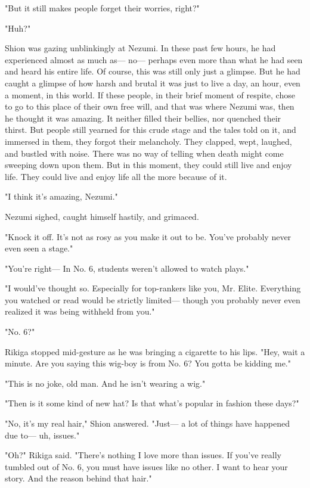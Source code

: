 "But it still makes people forget their worries, right?"

"Huh?"

Shion was gazing unblinkingly at Nezumi. In these past few hours, he had
experienced almost as much as--- no--- perhaps even more than what he had
seen and heard his entire life. Of course, this was still only just a
glimpse. But he had caught a glimpse of how harsh and brutal it was just
to live a day, an hour, even a moment, in this world. If these people,
in their brief moment of respite, chose to go to this place of their own
free will, and that was where Nezumi was, then he thought it was
amazing. It neither filled their bellies, nor quenched their thirst. But
people still yearned for this crude stage and the tales told on it, and
immersed in them, they forgot their melancholy. They clapped, wept,
laughed, and bustled with noise. There was no way of telling when death
might come sweeping down upon them. But in this moment, they could still
live and enjoy life. They could live and enjoy life all the more because
of it.

"I think it's amazing, Nezumi."

Nezumi sighed, caught himself hastily, and grimaced.

"Knock it off. It's not as rosy as you make it out to be. You've
probably never even seen a stage."

"You're right--- In No. 6, students weren't allowed to watch plays."

"I would've thought so. Especially for top-rankers like you, Mr. Elite.
Everything you watched or read would be strictly limited--- though you
probably never even realized it was being withheld from you."

"No. 6?"

Rikiga stopped mid-gesture as he was bringing a cigarette to his lips.
"Hey, wait a minute. Are you saying this wig-boy is from No. 6? You
gotta be kidding me."

"This is no joke, old man. And he isn't wearing a wig."

"Then is it some kind of new hat? Is that what's popular in fashion
these days?"

"No, it's my real hair," Shion answered. "Just--- a lot of things have
happened due to--- uh, issues."

"Oh?" Rikiga said. "There's nothing I love more than issues. If you've
really tumbled out of No. 6, you must have issues like no other. I want
to hear your story. And the reason behind that hair."

